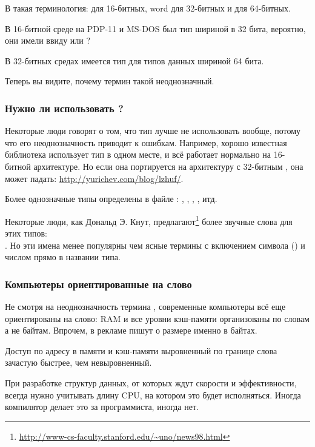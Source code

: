 В  такая терминология:  для 16-битных, \gls{word} для 32-битных и  для 64-битных.

В 16-битной среде \CCpp{} на PDP-11 и MS-DOS был тип  шириной в 32 бита, вероятно, они имели ввиду
 или ?

В 32-битных средах \CCpp{} имеется тип  для типов данных шириной 64 бита.

Теперь вы видите, почему термин  такой неоднозначный.

\subsubsection{Нужно ли использовать ?}

Некоторые люди говорят о том, что тип  лучше не использовать вообще, потому что его неоднозначность приводит
к ошибкам.
Например, хорошо известная библиотека  использует тип  в одном месте, и всё работает нормально на 16-битной
архитектуре.
Но если она портируется на архитектуру с 32-битным , она может падать: \url{http://yurichev.com/blog/lzhuf/}.

Более однозначные типы определены в файле :
, , , , итд.

Некоторые люди, как Дональд Э. Кнут, предлагают\footnote{\url{http://www-cs-faculty.stanford.edu/~uno/news98.html}}
более звучные слова для этих типов:\\
.
Но эти имена менее популярны чем ясные термины с включением символа  ()
и числом прямо в названии типа.

\subsubsection{Компьютеры ориентированные на слово}

Не смотря на неоднозначность термина , современные компьютеры всё еще ориентированы на слово:
\ac{RAM} и все уровни кэш-памяти организованы по словам а не байтам.
Впрочем, в рекламе пишут о размере именно в байтах.

Доступ по адресу в памяти и кэш-памяти выровненный по границе слова зачастую быстрее, чем невыровненный.

При разработке структур данных, от которых ждут скорости и эффективности, всегда нужно учитывать длину 
CPU, на котором это будет исполняться.
Иногда компилятор делает это за программиста, иногда нет.

